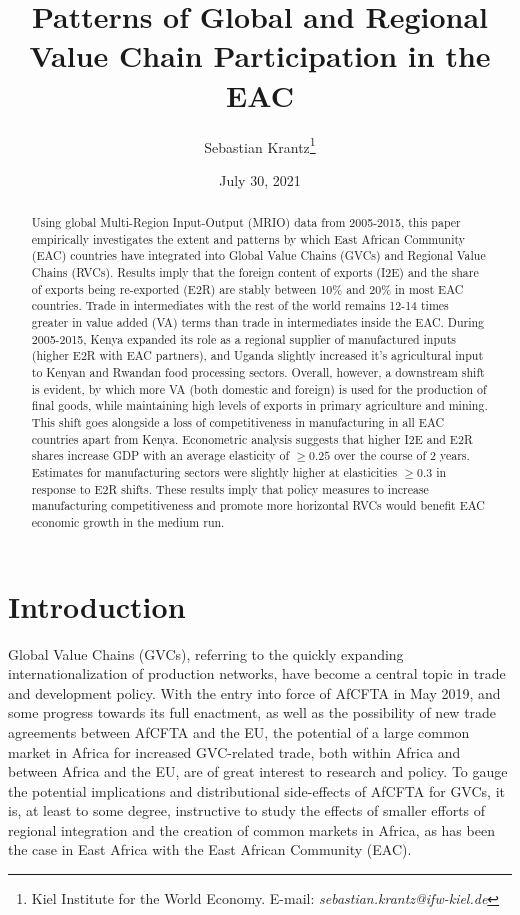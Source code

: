\documentclass[a4paper]{article}
\date{July 30, 2021}
\title{\textbf{Patterns of Global and Regional Value Chain Participation in the EAC}}
\author{Sebastian Krantz\footnote{Kiel Institute for the World Economy. E-mail: \emph{sebastian.krantz@ifw-kiel.de}}}
\begin{document}
\maketitle

\begin{abstract}
Using global Multi-Region Input-Output (MRIO) data from 2005-2015, this paper empirically investigates the extent and patterns by which East African Community (EAC) countries have integrated into Global Value Chains (GVCs) and Regional Value Chains (RVCs). Results imply that the foreign content of exports (I2E) and the share of exports being re-exported (E2R) are stably between 10\% and 20\% in most EAC countries. Trade in intermediates with the rest of the world remains 12-14 times greater in value added (VA) terms than trade in intermediates inside the EAC. During 2005-2015, Kenya expanded its role as a regional supplier of manufactured inputs (higher E2R with EAC partners), and Uganda slightly increased it's agricultural input to Kenyan and Rwandan food processing sectors. Overall, however,  a downstream shift is evident, by which more VA (both domestic and foreign) is used for the production of final goods, while maintaining high levels of exports in primary agriculture and mining. This shift goes alongside a loss of competitiveness in manufacturing in all EAC countries apart from Kenya. Econometric analysis suggests that higher I2E and E2R shares increase GDP with an average elasticity of $\geq 0.25$ over the course of 2 years. Estimates for manufacturing sectors were slightly higher at elasticities $\geq 0.3$ in response to E2R shifts. These results imply that policy measures to increase manufacturing competitiveness and promote more horizontal RVCs would benefit EAC economic growth in the medium run. 
\end{abstract}



\section{Introduction}

Global Value Chains (GVCs), referring to the quickly expanding internationalization of production networks, have become a central topic in trade and development policy. With the entry into force of AfCFTA in May 2019, and some progress towards its full enactment, as well as the possibility of new trade agreements between AfCFTA and the EU, the potential of a large common market in Africa for increased GVC-related trade, both within Africa and between Africa and the EU, are of great interest to research and policy. To gauge the potential implications and distributional side-effects of AfCFTA for GVCs, it is, at least to some degree, instructive to study the effects of smaller efforts of regional integration and the creation of common markets in Africa, as has been the case in East Africa with the East African Community (EAC). \newline 
\end{document}
